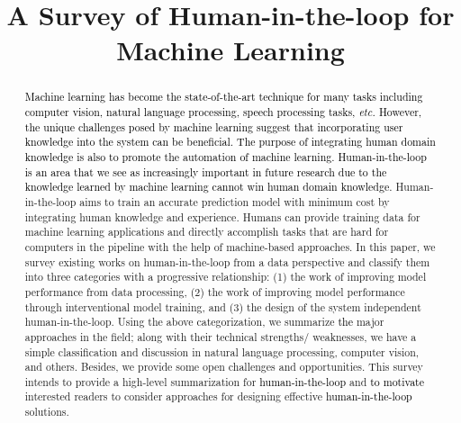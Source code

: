 \documentclass{article}
\newcommand\etc{\emph{etc.}}
\newcommand{\REO}[1]{\textcolor{black}{#1}}
\newcommand{\ZJH}[1]{\textcolor{black}{#1}}
\begin{document}
\UseRawInputEncoding


\title{A Survey of Human-in-the-loop for Machine Learning}

\address{\small{1 Shanghai Key Laboratory of Multidimensional Information Processing, East China Normal University, Shanghai, China}\\
\small{2 School of Computer Science and Technology, East China Normal University, Shanghai, China}\\
\small{3 Fudan University, Shanghai, China}\\
{\small \{wuxingjiao2885, louisshaw008, madmaxkgb, junhangzhang68\}@gmail.com, \{tlma, lhe\}@cs.ecnu.edu.cn}
}

\maketitle



\begin{abstract}
\REO{Machine learning has become the state-of-the-art technique for many tasks including computer vision, natural language processing, speech processing tasks, \ZJH{\etc}
However, the unique challenges posed by machine learning suggest that incorporating user knowledge into the system can be beneficial.
The purpose of integrating human domain knowledge is also to promote the automation of machine learning.
Human-in-the-loop is an area that we see as increasingly important in future research due to the knowledge learned by machine learning cannot win human domain knowledge. }
Human-in-the-loop aims to train an accurate prediction model with minimum cost by integrating human knowledge and experience.
Humans can provide training data for machine learning applications and directly accomplish tasks that are hard for computers in the pipeline with the help of machine-based approaches.
In this paper, we survey existing works on human-in-the-loop from a data perspective and classify them into three categories with a progressive relationship: (1) the work of improving model performance from data processing, (2) the work of improving model performance through interventional model training, and (3) the design of the system independent human-in-the-loop. Using the above categorization, we summarize \ZJH{the} major approaches in the field; along with their technical strengths/ weaknesses, we have a simple classification and discussion in natural language processing, computer vision, and others. Besides, we provide some open challenges and opportunities. This survey intends to provide a high-level summarization for \REO{human-in-the-loop} and \ZJH{ to motivate} interested readers to consider approaches for designing effective \REO{human-in-the-loop} solutions.

\end{abstract}
\end{document}
